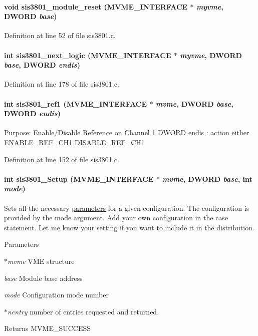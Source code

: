 \paragraph[{sis3801\_\-module\_\-reset}]{\setlength{\rightskip}{0pt plus 5cm}void sis3801\_\-module\_\-reset ({\bf MVME\_\-INTERFACE} $\ast$ {\em myvme}, \/  {\bf DWORD} {\em base})}\hfill\label{sis3801_8h_af470813cfb3217ccc86fd561d95ea401}


Definition at line 52 of file sis3801.c.
\paragraph[{sis3801\_\-next\_\-logic}]{\setlength{\rightskip}{0pt plus 5cm}int sis3801\_\-next\_\-logic ({\bf MVME\_\-INTERFACE} $\ast$ {\em myvme}, \/  {\bf DWORD} {\em base}, \/  {\bf DWORD} {\em endis})}\hfill\label{sis3801_8h_aa07bbce4156599eb0aa27121f8561975}


Definition at line 178 of file sis3801.c.
\paragraph[{sis3801\_\-ref1}]{\setlength{\rightskip}{0pt plus 5cm}int sis3801\_\-ref1 ({\bf MVME\_\-INTERFACE} $\ast$ {\em mvme}, \/  {\bf DWORD} {\em base}, \/  {\bf DWORD} {\em endis})}\hfill\label{sis3801_8h_a62a0e860cd93ba6b21e4b14aef66ffc7}
Purpose: Enable/Disable Reference on Channel 1 DWORD endis : action either ENABLE\_\-REF\_\-CH1 DISABLE\_\-REF\_\-CH1 

Definition at line 152 of file sis3801.c.
\paragraph[{sis3801\_\-Setup}]{\setlength{\rightskip}{0pt plus 5cm}int sis3801\_\-Setup ({\bf MVME\_\-INTERFACE} $\ast$ {\em mvme}, \/  {\bf DWORD} {\em base}, \/  int {\em mode})}\hfill\label{sis3801_8h_ac57f9b90cd1c32f77787df8702ece6d0}
Sets all the necessary \hyperlink{structparameters}{parameters} for a given configuration. The configuration is provided by the mode argument. Add your own configuration in the case statement. Let me know your setting if you want to include it in the distribution. 
\begin{DoxyParams}{Parameters}
\item[{\em $\ast$mvme}]VME structure \item[{\em base}]Module base address \item[{\em mode}]Configuration mode number \item[{\em $\ast$nentry}]number of entries requested and returned. \end{DoxyParams}
\begin{DoxyReturn}{Returns}
MVME\_\-SUCCESS 
\end{DoxyReturn}


